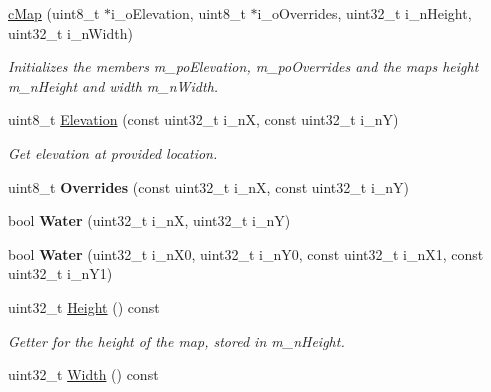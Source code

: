 \begin{DoxyCompactItemize}
\item 
\mbox{\label{classplanner_1_1c_map_aeb77fddb68116b3629ac016ff5e5b1a1}} 
\mbox{\hyperlink{classplanner_1_1c_map_aeb77fddb68116b3629ac016ff5e5b1a1}{c\+Map}} (uint8\+\_\+t $\ast$i\+\_\+o\+Elevation, uint8\+\_\+t $\ast$i\+\_\+o\+Overrides, uint32\+\_\+t i\+\_\+n\+Height, uint32\+\_\+t i\+\_\+n\+Width)
\begin{DoxyCompactList}\small\item\em Initializes the members m\+\_\+po\+Elevation, m\+\_\+po\+Overrides and the maps height m\+\_\+n\+Height and width m\+\_\+n\+Width. \end{DoxyCompactList}\item 
uint8\+\_\+t \mbox{\hyperlink{classplanner_1_1c_map_a41c03ff03846e147c24427367b06340e}{Elevation}} (const uint32\+\_\+t i\+\_\+nX, const uint32\+\_\+t i\+\_\+nY)
\begin{DoxyCompactList}\small\item\em Get elevation at provided location. \end{DoxyCompactList}\item 
\mbox{\label{classplanner_1_1c_map_a3f73c6d34d454a9c9fc5288e1762e1dc}} 
uint8\+\_\+t {\bfseries Overrides} (const uint32\+\_\+t i\+\_\+nX, const uint32\+\_\+t i\+\_\+nY)
\item 
\mbox{\label{classplanner_1_1c_map_af3085fcc9b947fe4d4689b7cfe076a14}} 
bool {\bfseries Water} (uint32\+\_\+t i\+\_\+nX, uint32\+\_\+t i\+\_\+nY)
\item 
\mbox{\label{classplanner_1_1c_map_a3584f8b50b39db3792497e2f98fb10c4}} 
bool {\bfseries Water} (uint32\+\_\+t i\+\_\+n\+X0, uint32\+\_\+t i\+\_\+n\+Y0, const uint32\+\_\+t i\+\_\+n\+X1, const uint32\+\_\+t i\+\_\+n\+Y1)
\item 
uint32\+\_\+t \mbox{\hyperlink{classplanner_1_1c_map_a3a2096d9cf11101cca5ff68800a08ae3}{Height}} () const
\begin{DoxyCompactList}\small\item\em Getter for the height of the map, stored in m\+\_\+n\+Height. \end{DoxyCompactList}\item 
uint32\+\_\+t \mbox{\hyperlink{classplanner_1_1c_map_a9bca5070a0adc4101af7e920ff697ecf}{Width}} () const

\end{DoxyCompactItemize}

